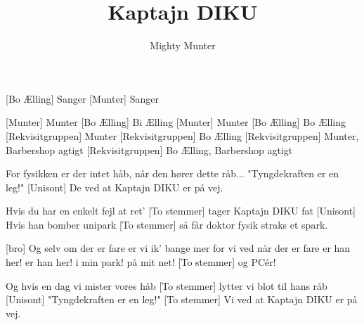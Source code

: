 \documentclass[a4paper,11pt]{article}
\title{Kaptajn DIKU}
\author{Mighty Munter}
\begin{document}
\maketitle

\begin{roles}
[Bo Ælling] Sanger
[Munter] Sanger
\end{roles}

\begin{props}
[Munter] Munter
[Bo Ælling] Bi Ælling
[Munter] Munter
[Bo Ælling] Bo Ælling
[Rekvisitgruppen] Munter
[Rekvisitgruppen] Bo Ælling
[Rekvisitgruppen] Munter, Barbershop agtigt
[Rekvisitgruppen] Bo Ælling, Barbershop agtigt


\end{props}

  
\begin{song}

For fysikken er der intet håb,
når den hører dette råb...
"Tyngdekraften er en leg!"
[Unisont] De ved at Kaptajn DIKU er på vej.

 Hvis du har en enkelt fejl at ret'
[To stemmer] tager Kaptajn DIKU fat
[Unisont] Hvis han bomber unipark
[To stemmer] så får doktor fysik straks et spark.

[bro] Og selv om der er fare
er vi ik' bange mer
for vi ved når der er fare
er han her!
 er han her!
 i min park!
 på mit net!
[To stemmer] og PCér!

Og hvis en dag vi mister vores håb
[To stemmer] lytter vi blot til hans råb
[Unisont] "Tyngdekraften er en leg!"
[To stemmer] Vi ved at Kaptajn DIKU er på vej.


\end{song}
\end{document}
